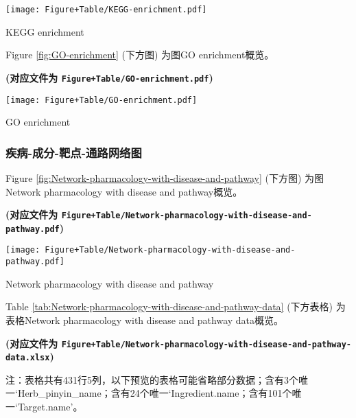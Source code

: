 \documentclass[
]{article}
\begin{document}
\def\@captype{figure}
\begin{center}
\texttt{[image: Figure+Table/KEGG-enrichment.pdf]}
\caption{KEGG enrichment}\label{fig:KEGG-enrichment}
\end{center}

Figure \ref{fig:GO-enrichment} (下方图) 为图GO enrichment概览。

\textbf{(对应文件为 \texttt{Figure+Table/GO-enrichment.pdf})}

\def\@captype{figure}
\begin{center}
\texttt{[image: Figure+Table/GO-enrichment.pdf]}
\caption{GO enrichment}\label{fig:GO-enrichment}
\end{center}

\hypertarget{ux75beux75c5-ux6210ux5206-ux9776ux70b9-ux901aux8defux7f51ux7edcux56fe}{%
\subsubsection{疾病-成分-靶点-通路网络图}\label{ux75beux75c5-ux6210ux5206-ux9776ux70b9-ux901aux8defux7f51ux7edcux56fe}}

Figure \ref{fig:Network-pharmacology-with-disease-and-pathway} (下方图) 为图Network pharmacology with disease and pathway概览。

\textbf{(对应文件为 \texttt{Figure+Table/Network-pharmacology-with-disease-and-pathway.pdf})}

\def\@captype{figure}
\begin{center}
\texttt{[image: Figure+Table/Network-pharmacology-with-disease-and-pathway.pdf]}
\caption{Network pharmacology with disease and pathway}\label{fig:Network-pharmacology-with-disease-and-pathway}
\end{center}

Table \ref{tab:Network-pharmacology-with-disease-and-pathway-data} (下方表格) 为表格Network pharmacology with disease and pathway data概览。

\textbf{(对应文件为 \texttt{Figure+Table/Network-pharmacology-with-disease-and-pathway-data.xlsx})}

\begin{center}\begin{tcolorbox}[colback=gray!10, colframe=gray!50, width=0.9\linewidth, arc=1mm, boxrule=0.5pt]注：表格共有431行5列，以下预览的表格可能省略部分数据；含有3个唯一`Herb\_pinyin\_name；含有24个唯一`Ingredient.name；含有101个唯一`Target.name'。
\end{tcolorbox}
\end{center}
\end{document}
